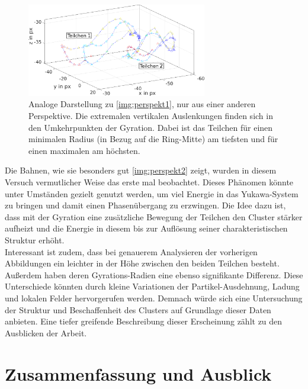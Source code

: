             \begin{figure}[!h]
              \centering
              \includegraphics[width=0.7\textwidth]{figs/auswertung/gyratcoloredzwei.png}
              \caption{Analoge Darstellung zu \autoref{img:perspekt1}, nur aus einer anderen Perspektive. Die extremalen vertikalen Auslenkungen finden sich in den Umkehrpunkten der Gyration. Dabei ist das Teilchen für einen minimalen Radius (in Bezug auf die Ring-Mitte) am tiefsten und für einen maximalen am höchsten.}\label{img:perspekt2}
            \end{figure}

          Die Bahnen, wie sie besonders gut \autoref{img:perspekt2} zeigt, wurden in diesem Versuch vermutlicher Weise das erste mal beobachtet. Dieses Phänomen könnte unter Umständen gezielt genutzt werden, um viel Energie in das Yukawa-System zu bringen und damit einen Phasenübergang zu erzwingen. Die Idee dazu ist, dass mit der Gyration eine zusätzliche Bewegung der Teilchen den Cluster stärker aufheizt und die Energie in diesem bis zur Auflösung seiner charakteristischen Struktur erhöht.\\
          Interessant ist zudem, dass bei genauerem Analysieren der vorherigen Abbildungen ein leichter  in der Höhe zwischen den beiden Teilchen besteht. Außerdem haben deren Gyrations-Radien eine ebenso signifikante Differenz. Diese Unterschiede könnten durch kleine Variationen der Partikel-Ausdehnung, Ladung und lokalen Felder hervorgerufen werden. Demnach würde sich eine Untersuchung der Struktur und Beschaffenheit des Clusters auf Grundlage dieser Daten anbieten. Eine tiefer greifende Beschreibung dieser Erscheinung zählt zu den Ausblicken der Arbeit.

\newpage

  \section{Zusammenfassung und Ausblick}

